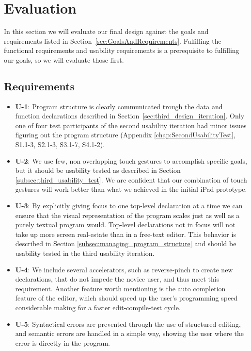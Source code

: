 \chapter{Evaluation}
\label{sec:Evaluation}
In this section we will evaluate our final design against the goals and requirements listed in Section~\ref{sec:GoalsAndRequirements}.
Fulfilling the functional requirements and usability requirements is a
prerequisite to fulfilling our goals, so we will evaluate those first.

\section{Requirements}
\begin{itemize}

\item \textbf{U-1}: Program structure is clearly communicated trough the data and function declarations described in Section~\ref{sec:third_design_iteration}.
Only one of four test participants of the second usability iteration had minor
issues figuring out the program structure (Appendix \ref{chap:SecondUsabilityTest},
S1.1-3, S2.1-3, S3.1-7, S4.1-2).
\item \textbf{U-2}: We use few, non overlapping touch gestures to accomplish specific goals,
but it should be usability tested as described in Section \ref{subsec:third_usability_test}.
We are confident that our combination of touch gestures will work better than
what we achieved in the initial iPad prototype.
\item \textbf{U-3}: By explicitly giving focus to one top-level declaration at
a time we can ensure that the visual representation of the program scales just
as well as a purely textual program would. Top-level declarations not in focus
will not take up more screen real-estate than in a free-text editor. This
behavior is described in Section \ref{subsec:managing_program_structure} and
should be usability tested in the third usability iteration.
\item \textbf{U-4}: We include several accelerators, such as reverse-pinch to create new declarations, that do not impede the novice user, and thus meet this requirement.
Another feature worth mentioning is the auto completion feature of the editor,
which should speed up the user's programming speed considerable making for a
faster edit-compile-test cycle.
\item \textbf{U-5}: Syntactical errors are prevented through the use of structured editing, and semantic errors are handled in a simple way, showing the user where the error is directly in the program.

\end{itemize}
